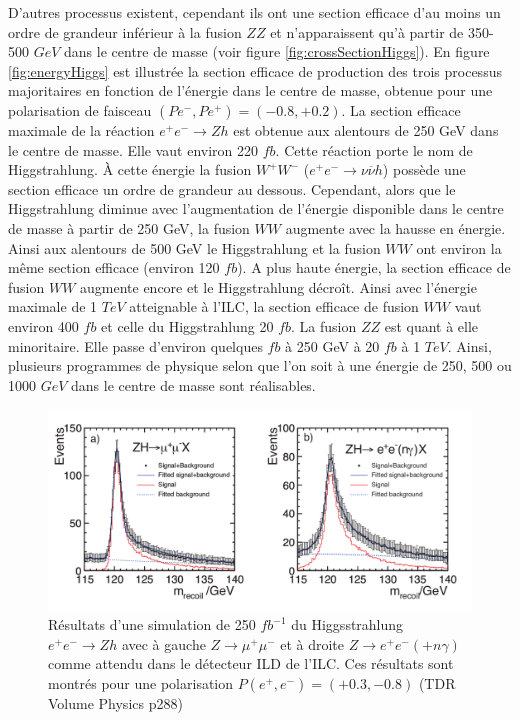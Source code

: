    D'autres processus existent, cependant ils ont une section efficace d'au moins un ordre de grandeur inf\'erieur \`a la fusion $ZZ$ et n'apparaissent qu'\`a partir de 350-500 $GeV$ dans le centre de masse (voir figure \ref{fig:crossSectionHiggs}). En figure \ref{fig:energyHiggs} est illustr\'ee la section efficace de production des trois processus majoritaires en fonction de l'\'energie dans le centre de masse, obtenue pour une polarisation de faisceau $(Pe^- , Pe^+ ) = (-0.8 , +0.2)$. La section efficace maximale de la r\'eaction $e^+ e^- \rightarrow Zh$ est obtenue aux alentours de 250 GeV dans le centre de masse. Elle vaut environ 220 $fb$. Cette r\'eaction porte le nom de Higgstrahlung. \`A cette \'energie la fusion $W^+W^-$ ($e^+ e^- \rightarrow \nu \overline{\nu} h$) poss\`ede une section efficace un ordre de grandeur au dessous. Cependant, alors que le Higgstrahlung diminue avec l'augmentation de l'\'energie disponible dans le centre de masse \`a partir de 250 GeV, la fusion $WW$ augmente avec la hausse en \'energie. Ainsi aux alentours de 500 GeV le Higgstrahlung et la fusion $WW$ ont environ la même section efficace (environ 120 $fb$). A plus haute \'energie, la section efficace de fusion $WW$ augmente encore et le Higgstrahlung d\'ecro\^it. Ainsi avec l'\'energie maximale de 1 $TeV$ atteignable \`a l'ILC, la section efficace de fusion $WW$ vaut environ 400 $fb$ et celle du Higgstrahlung 20 $fb$. La fusion $ZZ$ est quant \`a elle minoritaire. Elle passe d'environ quelques $fb$ \`a 250 GeV \`a 20 $fb$ \`a 1 $TeV$. Ainsi, plusieurs programmes de physique selon que l'on soit \`a une \'energie de 250, 500 ou 1000 $GeV$ dans le centre de masse sont r\'ealisables. 
   
   \medskip
   
   \begin{figure}[!htb]
     \begin{center} 
       \includegraphics[scale=0.35]{./figures/recoil_mass_Higgs.png}
       \caption{ R\'esultats d'une simulation de 250 $fb^{-1}$ du Higgsstrahlung $e^+ e^- \rightarrow Z h$ avec \`a gauche $Z \rightarrow \mu^+ \mu^-$  et \`a droite $Z \rightarrow e^+ e^- (+n \gamma)$ comme attendu dans le d\'etecteur ILD de l'ILC. Ces r\'esultats sont montr\'es pour une polarisation $P(e^+ , e^-) = (+0.3 , -0.8)$ (TDR Volume Physics \cite{Behnke:2013lya} p288)}
     \label{fig:simuILC}
     \end{center}
  \end{figure}

